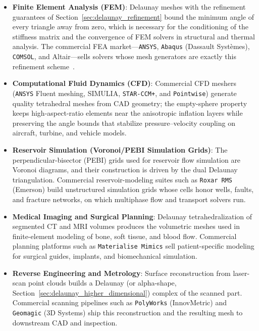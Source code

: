 \begin{itemize}
\item \textbf{Finite Element Analysis (FEM)}: Delaunay meshes with the
  refinement guarantees of Section~\ref{sec:delaunay_refinement} bound the
  minimum angle of every triangle away from zero, which is necessary for the
  conditioning of the stiffness matrix and the convergence of FEM solvers in
  structural and thermal analysis. The commercial FEA market---\texttt{ANSYS},
  \texttt{Abaqus} (Dassault Syst\`emes), \texttt{COMSOL}, and Altair---sells
  solvers whose mesh generators are exactly this refinement
  scheme~\cite{shewchuk1998}.

\item \textbf{Computational Fluid Dynamics (CFD)}: Commercial CFD meshers
  (\texttt{ANSYS} Fluent meshing, SIMULIA, \texttt{STAR-CCM+}, and
  \texttt{Pointwise}) generate quality tetrahedral meshes from CAD geometry;
  the empty-sphere property keeps high-aspect-ratio elements near the
  anisotropic inflation layers while preserving the angle bounds that
  stabilize pressure--velocity coupling on aircraft, turbine, and vehicle
  models.

\item \textbf{Reservoir Simulation (Voronoi/PEBI Simulation Grids)}: The
  perpendicular-bisector (PEBI) grids used for reservoir flow simulation are
  Voronoi diagrams, and their construction is driven by the dual Delaunay
  triangulation. Commercial reservoir-modeling suites such as \texttt{Roxar
  RMS} (Emerson) build unstructured simulation grids whose cells honor
  wells, faults, and fracture networks, on which multiphase flow and
  transport solvers run.

\item \textbf{Medical Imaging and Surgical Planning}: Delaunay
  tetrahedralization of segmented CT and MRI volumes produces the volumetric
  meshes used in finite-element modeling of bone, soft tissue, and blood
  flow. Commercial planning platforms such as \texttt{Materialise Mimics}
  sell patient-specific modeling for surgical guides, implants, and
  biomechanical simulation.

\item \textbf{Reverse Engineering and Metrology}: Surface reconstruction
  from laser-scan point clouds builds a Delaunay (or alpha-shape,
  Section~\ref{sec:delaunay_higher_dimensional}) complex of the scanned
  part. Commercial scanning pipelines such as \texttt{PolyWorks}
  (InnovMetric) and \texttt{Geomagic} (3D Systems) ship this reconstruction
  and the resulting mesh to downstream CAD and inspection.


\end{itemize}
